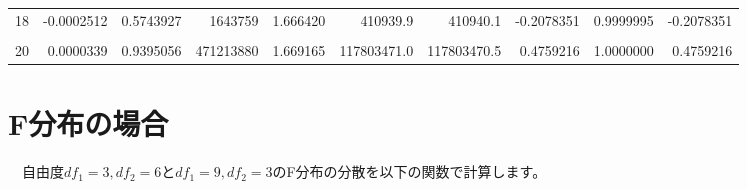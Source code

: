 \documentclass[a4paper]{tufte-handout}
\begin{document}
\begin{table}
{\begin{tabular}[t]{rrrrrrrrrr}
18 & -0.0002512 & 0.5743927 & 1643759 & 1.666420 & 410939.9 & 410940.1 & -0.2078351 & 0.9999995 & -0.2078351\\
\cellcolor{gray!6}{19} & \cellcolor{gray!6}{0.0000852} & \cellcolor{gray!6}{0.8489663} & \cellcolor{gray!6}{2205786} & \cellcolor{gray!6}{1.668551} & \cellcolor{gray!6}{551446.9} & \cellcolor{gray!6}{551446.9} & \cellcolor{gray!6}{0.0816938} & \cellcolor{gray!6}{1.0000001} & \cellcolor{gray!6}{0.0816938}\\
20 & 0.0000339 & 0.9395056 & 471213880 & 1.669165 & 117803471.0 & 117803470.5 & 0.4759216 & 1.0000000 & 0.4759216\\
\bottomrule
\end{tabular}}
\end{table}

\newpage

\hypertarget{fux5206ux5e03ux306eux5834ux5408}{%
\section{\texorpdfstring{\textbf{F分布の場合}}{F分布の場合}}\label{fux5206ux5e03ux306eux5834ux5408}}

　自由度\(df_1 = 3, df_2 = 6\)と\(df_1 = 9, df_2 = 3\)のF分布の分散を以下の関数で計算します。
\end{document}
